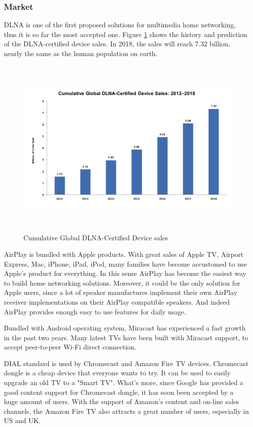 \subsubsection{Market\label{2_3_2}} 
DLNA is one of the first proposed solutions for multimedia home 
networking, thus it is so far the most accepted one. Figure 
\ref{dlna_market} shows the history and prediction of the DLNA-certified device sales. In 2018, the 
sales will reach 7.32 billion, nearly the same as the human population on earth.

\begin{figure}[htb] 
\centering \includegraphics[height=9cm]{charts/dlna_market} 
\caption{Cumulative Global DLNA-Certified Device sales \label{dlna_market}} 
\end{figure}
 
AirPlay is bundled with Apple products. With great sales of Apple TV, Airport Express, 
Mac, iPhone, iPad, iPod, many families have become accustomed to use Apple's
product for everything. In this sense AirPlay has become the easiest way to
build home networking solutions. Moreover, it could be the only solution for
Apple users, since a lot of speaker manufactures implement their own AirPlay
receiver implementations on their AirPlay compatible speakers. And indeed
AirPlay provides enough easy to use features for daily usage.

Bundled with Android operating system, Miracast has experienced a fast growth in 
the past two years. Many latest TVs have been built with Miracast support, to accept peer-to-peer Wi-Fi direct connection.

DIAL standard is used by Chromecast and Amazon Fire TV devices. Chromecast
dongle is a cheap device that everyone wants to try. It can be used to easily
upgrade an old TV to a "Smart TV".  What's more, since Google has provided a
good content support for Chromecast dongle, it has soon been accepted by a huge
amount of users. With the support of Amazon's content and on-line sales
channels, the Amazon Fire TV also attracts a great number of users, especially
in US and UK.

